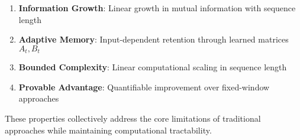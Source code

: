 \begin{enumerate}
    \item \textbf{Information Growth}: Linear growth in mutual information with sequence length
    \item \textbf{Adaptive Memory}: Input-dependent retention through learned matrices $A_t, B_t$
    \item \textbf{Bounded Complexity}: Linear computational scaling in sequence length
    \item \textbf{Provable Advantage}: Quantifiable improvement over fixed-window approaches
\end{enumerate}

These properties collectively address the core limitations of traditional approaches while maintaining computational tractability.